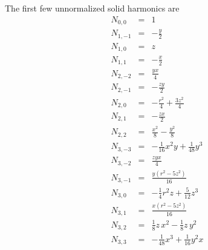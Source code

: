 \documentclass[12pt]{article}
\begin{document}
The first few unnormalized solid harmonics are
\begin{eqnarray}
N_{0, 0} & = &  1  \nonumber \\
N_{1, -1} & = &  -\frac{y}{2}  \nonumber \\
N_{1, 0} & = &  z  \nonumber \\
N_{1, 1} & = &  -\frac{x}{2}  \nonumber \\
N_{2, -2} & = &  \frac{y x}{4}  \nonumber \\
N_{2, -1} & = &  -\frac{z y}{2}  \nonumber \\
N_{2, 0} & = &  -\frac{r^{2}}{4}+\frac{3 z^{2}}{4}  \nonumber \\
N_{2, 1} & = &  -\frac{z x}{2}  \nonumber \\
N_{2, 2} & = &  \frac{x^{2}}{8}-\frac{y^{2}}{8}  \nonumber \\
N_{3, -3} & = &  -\frac{1}{16} x^{2} y +\frac{1}{48} y^{3}  \nonumber \\
N_{3, -2} & = &  \frac{z y x}{4}  \nonumber \\
N_{3, -1} & = &  \frac{y \left(r^{2}-5 z^{2}\right)}{16}  \nonumber \\
N_{3, 0} & = &  -\frac{1}{4} r^{2} z +\frac{5}{12} z^{3}  \nonumber \\
N_{3, 1} & = &  \frac{x \left(r^{2}-5 z^{2}\right)}{16}  \nonumber \\
N_{3, 2} & = &  \frac{1}{8} z \,x^{2}-\frac{1}{8} z \,y^{2}  \nonumber \\
N_{3, 3} & = &  -\frac{1}{48} x^{3}+\frac{1}{16} y^{2} x  \nonumber
\end{eqnarray}
\end{document}
